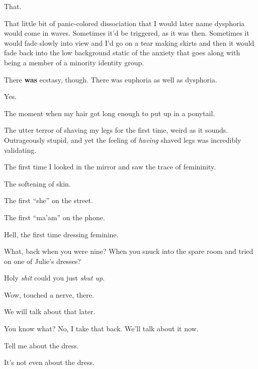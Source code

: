 \begin{paracol}{2}
\begin{leftcolumn}
That.

That little bit of panic-colored dissociation that I would later name dysphoria would come in waves. Sometimes it'd be triggered, as it was then. Sometimes it would fade slowly into view and I'd go on a tear making skirts and then it would fade back into the low background static of the anxiety that goes along with being a member of a minority identity group.

\begin{ally}
There \textbf{was} ecstasy, though. There was euphoria as well as dysphoria.
\end{ally}
Yes.

The moment when my hair got long enough to put up in a ponytail.

The utter terror of shaving my legs for the first time, weird as it sounds. Outrageously stupid, and yet the feeling of \emph{having} shaved legs was incredibly validating.

The first time I looked in the mirror and saw the trace of femininity.

The softening of skin.

The first ``she'' on the street.

The first ``ma'am'' on the phone.

Hell, the first time dressing feminine.

\begin{ally}
What, back when you were nine? When you snuck into the spare room and tried on one of Julie's dresses?
\end{ally}
Holy \emph{shit} could you just \emph{shut up}.

\begin{ally}
Wow, touched a nerve, there.
\end{ally}
We will talk about that later.
\newpage

\noindent You know what? No, I take that back. We'll talk about it now.

\begin{ally}
Tell me about the dress.
\end{ally}
It's not even about the dress.
\newpage
\end{leftcolumn}
\end{paracol}
